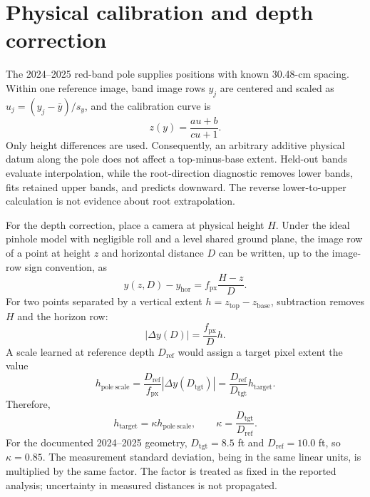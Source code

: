 \documentclass[12pt,letterpaper]{article}
\begin{document}
\section{Physical calibration and depth correction}
\label{sec:s-calibration}

The 2024--2025 red-band pole supplies positions with known 30.48-cm spacing. Within one reference image, band image rows $y_j$ are centered and scaled as $u_j=(y_j-\bar y)/s_y$, and the calibration curve is
\begin{equation}
z(y)=\frac{au+b}{cu+1}.
\label{eq:s-projective}
\end{equation}
Only height differences are used. Consequently, an arbitrary additive physical datum along the pole does not affect a top-minus-base extent. Held-out bands evaluate interpolation, while the root-direction diagnostic removes lower bands, fits retained upper bands, and predicts downward. The reverse lower-to-upper calculation is not evidence about root extrapolation.

For the depth correction, place a camera at physical height $H$. Under the ideal pinhole model with negligible roll and a level shared ground plane, the image row of a point at height $z$ and horizontal distance $D$ can be written, up to the image-row sign convention, as
\begin{equation}
y(z,D)-y_{\mathrm{hor}}=f_{\mathrm{px}}\frac{H-z}{D}.
\label{eq:s-pinhole}
\end{equation}
For two points separated by a vertical extent $h=z_{\mathrm{top}}-z_{\mathrm{base}}$, subtraction removes $H$ and the horizon row:
\begin{equation}
\left|\Delta y(D)\right|=\frac{f_{\mathrm{px}}}{D}h.
\label{eq:s-extent}
\end{equation}
A scale learned at reference depth $D_{\mathrm{ref}}$ would assign a target pixel extent the value
\begin{equation}
h_{\mathrm{pole\ scale}}
=\frac{D_{\mathrm{ref}}}{f_{\mathrm{px}}}\left|\Delta y(D_{\mathrm{tgt}})\right|
=\frac{D_{\mathrm{ref}}}{D_{\mathrm{tgt}}}h_{\mathrm{target}}.
\label{eq:s-depth-bias}
\end{equation}
Therefore,
\begin{equation}
h_{\mathrm{target}}
=\kappa h_{\mathrm{pole\ scale}},
\qquad
\kappa=\frac{D_{\mathrm{tgt}}}{D_{\mathrm{ref}}}.
\label{eq:s-depth-correction}
\end{equation}
For the documented 2024--2025 geometry, $D_{\mathrm{tgt}}=8.5$ ft and $D_{\mathrm{ref}}=10.0$ ft, so $\kappa=0.85$. The measurement standard deviation, being in the same linear units, is multiplied by the same factor. The factor is treated as fixed in the reported analysis; uncertainty in measured distances is not propagated.
\end{document}
